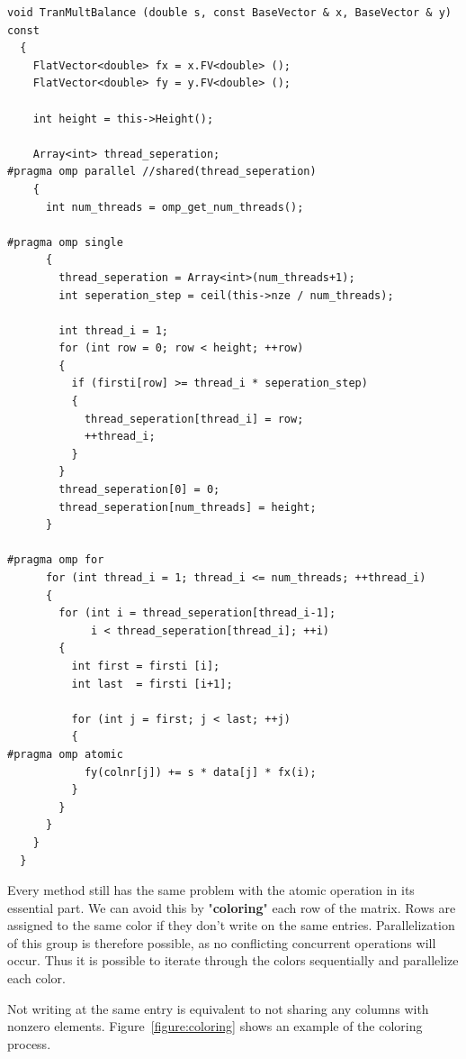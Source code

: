 \documentclass[a4paper,11pt]{scrartcl}
\begin{document}
\begin{lstlisting}
void TranMultBalance (double s, const BaseVector & x, BaseVector & y) const
  {
    FlatVector<double> fx = x.FV<double> ();
    FlatVector<double> fy = y.FV<double> ();

    int height = this->Height();

    Array<int> thread_seperation;
#pragma omp parallel //shared(thread_seperation)
    {
      int num_threads = omp_get_num_threads();

#pragma omp single
      {
        thread_seperation = Array<int>(num_threads+1);
        int seperation_step = ceil(this->nze / num_threads);

        int thread_i = 1;
        for (int row = 0; row < height; ++row)
        {
          if (firsti[row] >= thread_i * seperation_step)
          {
            thread_seperation[thread_i] = row;
            ++thread_i;
          }
        }
        thread_seperation[0] = 0;
        thread_seperation[num_threads] = height;
      }

#pragma omp for
      for (int thread_i = 1; thread_i <= num_threads; ++thread_i)
      {
        for (int i = thread_seperation[thread_i-1];
             i < thread_seperation[thread_i]; ++i)
        {
          int first = firsti [i];
          int last  = firsti [i+1];

          for (int j = first; j < last; ++j)
          {
#pragma omp atomic
            fy(colnr[j]) += s * data[j] * fx(i);
          }
        }
      }
    }
  }

\end{lstlisting}

Every method still has the same problem with the atomic operation in its
essential part. We can avoid this by "\textbf{coloring}" each row of the matrix.
Rows are assigned to the same color if they don't write on the same entries.
Parallelization of this group is therefore possible, as no conflicting
concurrent operations will occur. Thus it is possible to iterate through the
colors sequentially and parallelize each color.

Not writing at the same entry is equivalent to not sharing any columns with
nonzero elements. Figure~\ref{figure:coloring} shows an example of the
coloring process.
\end{document}
